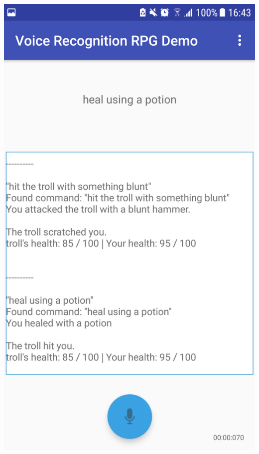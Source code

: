 \documentclass[11pt]{article}
\begin{document}
\begin{center}
\includegraphics[scale=0.18]{battle-3.png}

\end{center}
\end{document}
